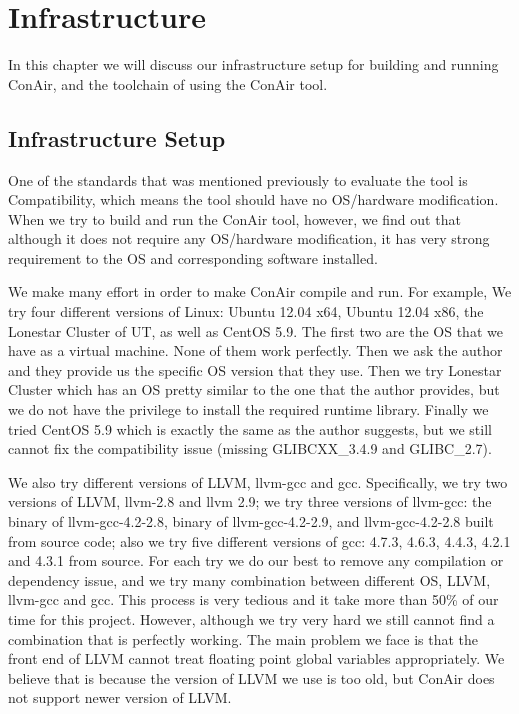 \section{Infrastructure}
In this chapter we will discuss our infrastructure setup for building and
running ConAir, and the toolchain of using the ConAir tool.

\subsection{Infrastructure Setup}
One of the standards that was mentioned previously to evaluate the tool is
Compatibility, which means the tool should have no OS/hardware modification.
When we try to build and run the ConAir tool, however, we find out that although
it does not require any OS/hardware modification, it has very strong requirement
to the OS and corresponding software installed.

We make many effort in order to make ConAir compile and run. For example, We try
four different versions of Linux: Ubuntu 12.04 x64, Ubuntu 12.04 x86, the
Lonestar Cluster of UT, as well as CentOS 5.9. The first two are the OS that we
have as a virtual machine. None of them work perfectly. Then we ask the
author and they provide us the specific OS version that they use. Then we try
Lonestar Cluster which has an OS pretty similar to the one that the author
provides, but we do not have the privilege to install the required runtime
library. Finally we tried CentOS 5.9 which is exactly the same as the author
suggests, but we still cannot fix the compatibility issue (missing GLIBCXX\_3.4.9
and GLIBC\_2.7).

We also try different versions of LLVM, llvm-gcc and gcc. Specifically, we try
two versions of LLVM, llvm-2.8 and llvm 2.9; we try three versions of llvm-gcc:
the binary of llvm-gcc-4.2-2.8, binary of llvm-gcc-4.2-2.9, and llvm-gcc-4.2-2.8
built from source code; also we try five different versions of gcc: 4.7.3,
4.6.3, 4.4.3, 4.2.1 and 4.3.1 from source. For each try we do our best to remove
any compilation or dependency issue, and we try many combination between
different OS, LLVM, llvm-gcc and gcc. This process is very tedious and it take
more than 50\% of our time for this project. However, although we try very hard
we still cannot find a combination that is perfectly working. The main problem
we face is that the front end of LLVM cannot treat floating point global
variables appropriately. We believe that is because the version of LLVM we use
is too old, but ConAir does not support newer version of LLVM.

